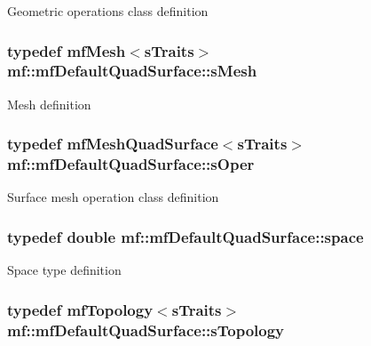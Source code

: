 \label{structmf_1_1mfDefaultQuadSurface_a61318df86637b442010db8e044f08f18}
Geometric operations class definition \hypertarget{structmf_1_1mfDefaultQuadSurface_ae1ec7d23c26e764a2f3f48d5b55853a1}{
\subsubsection[{sMesh}]{\setlength{\rightskip}{0pt plus 5cm}typedef {\bf mfMesh}$<${\bf sTraits}$>$ {\bf mf::mfDefaultQuadSurface::sMesh}}}
\label{structmf_1_1mfDefaultQuadSurface_ae1ec7d23c26e764a2f3f48d5b55853a1}
Mesh definition \hypertarget{structmf_1_1mfDefaultQuadSurface_a8127d8ebc79269fd47ae392b3a41c76e}{
\subsubsection[{sOper}]{\setlength{\rightskip}{0pt plus 5cm}typedef {\bf mfMeshQuadSurface}$<${\bf sTraits}$>$ {\bf mf::mfDefaultQuadSurface::sOper}}}
\label{structmf_1_1mfDefaultQuadSurface_a8127d8ebc79269fd47ae392b3a41c76e}
Surface mesh operation class definition \hypertarget{structmf_1_1mfDefaultQuadSurface_a8068e0e3bd65f3104214374571b5c477}{
\subsubsection[{space}]{\setlength{\rightskip}{0pt plus 5cm}typedef double {\bf mf::mfDefaultQuadSurface::space}}}
\label{structmf_1_1mfDefaultQuadSurface_a8068e0e3bd65f3104214374571b5c477}
Space type definition \hypertarget{structmf_1_1mfDefaultQuadSurface_a333e0d3288d81acd9f542e42452fad78}{
\subsubsection[{sTopology}]{\setlength{\rightskip}{0pt plus 5cm}typedef {\bf mfTopology}$<${\bf sTraits}$>$ {\bf mf::mfDefaultQuadSurface::sTopology}}}
\label{structmf_1_1mfDefaultQuadSurface_a333e0d3288d81acd9f542e42452fad78}
